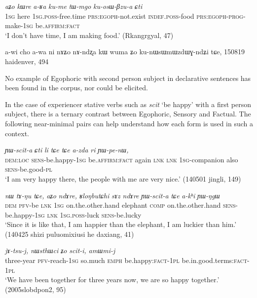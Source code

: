 \documentclass[oldfontcommands,oneside,a4paper,11pt]{article}
\newcommand{\ipa}[1]{{\phon\textit{#1}}} %
\newcommand{\factual}[1]{\textsc{:fact}}
\begin{document}
\begin{exe}
\ex \label{ex:kume}
\gll 
\ipa{aʑo}  	\ipa{kɯre}  	\ipa{a-ʁa}  	\ipa{ku-me}  \ipa{tɯ-mgo} 	\ipa{ku-osɯ-βzu-a} 	\ipa{ɕti} 	  	\\
\textsc{1sg} here \textsc{1sg.poss}-free.time \textsc{prs:egoph}-not.exist \textsc{indef.poss}-food \textsc{prs:egoph}-\textsc{prog}-make-\textsc{1sg} be.\textsc{affirm}\factual{}  \\
\glt `I don't have time, I am making food.'  (Rkangrgyal, 47)
\end{exe}

a-wi cho a-wa ni nɤʑo nɤ-ndʐa kɯ wuma ʑo ku-nɯsɯmɯzdɯɣ-ndʑi tɕe,
150819 haidenver, 494

No example of Egophoric with second person subject in declarative sentences has been found in the corpus, nor could be elicited.

In the case of experiencer stative verbs such as \ipa{scit} `be happy' with a first person subject, there is a ternary contrast between Egophoric, Sensory and Factual. The following near-minimal pairs can help understand how each form is used in such a context.

\begin{exe}
\ex \label{ex:YWscita}
\gll  \ipa{nɯtɕu} 	\ipa{ɲɯ-scit-a} 	\ipa{ɕti} 	\ipa{li} 	\ipa{tɕe} 	\ipa{tɕe} 	\ipa{a-zda} 	\ipa{ri} 	\ipa{ɲɯ-pe-nɯ,} \\
\textsc{dem:loc} \textsc{sens}-be.happy-\textsc{1sg} be.\textsc{affirm}:\textsc{fact} again \textsc{lnk} \textsc{lnk} \textsc{1sg}-companion also \textsc{sens}-be.good-\textsc{pl} \\
\glt `I am very happy there, the people with me are very nice.' (140501 jingli, 149)
\end{exe}


\begin{exe}
\ex \label{ex:YWscita2}
\gll 
\ipa{nɯ} 	\ipa{tɤ-ŋu} 	\ipa{tɕe,} 	\ipa{aʑo} 	\ipa{ndɤre,} 	\ipa{ʁloŋbutɕhi} 	\ipa{sɤz} 	\ipa{ndɤre} 	\ipa{ɲɯ-scit-a} 	\ipa{tɕe} 	\ipa{a-kʰi} 	\ipa{ɲɯ-ŋgɯ} \\
\textsc{dem} \textsc{pfv}-be \textsc{lnk} \textsc{1sg} on.the.other.hand elephant \textsc{comp} on.the.other.hand \textsc{sens}-be.happy-\textsc{1sg} \textsc{lnk} \textsc{1sg.poss}-luck \textsc{sens}-be.lucky \\
\glt `Since it is like that, I am happier than the elephant, I am luckier than him.' (140425 shizi puluomixiusi he daxiang, 41)
\end{exe}


\begin{exe}
\ex \label{ex:sciti}
\gll \ipa{χsɯ-xpa} 	\ipa{jɤ-tsu-j,} 	\ipa{nɯsthɯci} 	\ipa{ʑo} \ipa{scit-i,} 	\ipa{amɯmi-j}  \\
three-year \textsc{pfv}-reach-\textsc{1sg} so.much \textsc{emph} be.happy:\textsc{fact-1pl} be.in.good.terms:\textsc{fact-1pl} \\
\glt `We have been together for three years now, we are so happy together.' (2005slobdpon2, 95)
\end{exe}
\end{document}
